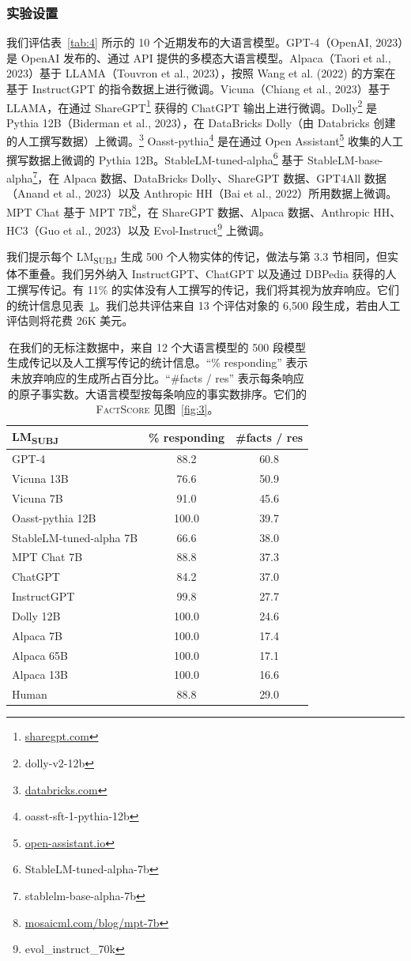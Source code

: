 \documentclass[11pt,UTF8,fontset=fandol]{ctexart}
\newcommand{\FS}{\textsc{FactScore}}
\newcommand{\subj}{LM\textsubscript{SUBJ}}
\begin{document}
\subsubsection{实验设置}

我们评估表~\ref{tab:4} 所示的 10 个近期发布的大语言模型。GPT-4（OpenAI, 2023）是 OpenAI 发布的、通过 API 提供的多模态大语言模型。Alpaca（Taori et al., 2023）基于 LLAMA（Touvron et al., 2023），按照 Wang et al. (2022) 的方案在基于 InstructGPT 的指令数据上进行微调。Vicuna（Chiang et al., 2023）基于 LLAMA，在通过 ShareGPT\footnote{\url{sharegpt.com}} 获得的 ChatGPT 输出上进行微调。Dolly\footnote{dolly-v2-12b} 是 Pythia 12B（Biderman et al., 2023），在 DataBricks Dolly（由 Databricks 创建的人工撰写数据）上微调。\footnote{\url{databricks.com}} Oasst-pythia\footnote{oasst-sft-1-pythia-12b} 是在通过 Open Assistant\footnote{\url{open-assistant.io}} 收集的人工撰写数据上微调的 Pythia 12B。StableLM-tuned-alpha\footnote{StableLM-tuned-alpha-7b} 基于 StableLM-base-alpha\footnote{stablelm-base-alpha-7b}，在 Alpaca 数据、DataBricks Dolly、ShareGPT 数据、GPT4All 数据（Anand et al., 2023）以及 Anthropic HH（Bai et al., 2022）所用数据上微调。MPT Chat 基于 MPT 7B\footnote{\url{mosaicml.com/blog/mpt-7b}}，在 ShareGPT 数据、Alpaca 数据、Anthropic HH、HC3（Guo et al., 2023）以及 Evol-Instruct\footnote{evol\_instruct\_70k} 上微调。

我们提示每个 \subj{} 生成 500 个人物实体的传记，做法与第 3.3 节相同，但实体不重叠。我们另外纳入 InstructGPT、ChatGPT 以及通过 DBPedia 获得的人工撰写传记。有 11\% 的实体没有人工撰写的传记，我们将其视为放弃响应。它们的统计信息见表~\ref{tab:5}。我们总共评估来自 13 个评估对象的 6{,}500 段生成，若由人工评估则将花费 26K 美元。

\begin{table}[H]\centering
\caption{在我们的无标注数据中，来自 12 个大语言模型的 500 段模型生成传记以及人工撰写传记的统计信息。“\% responding” 表示未放弃响应的生成所占百分比。“\#facts / res” 表示每条响应的原子事实数。大语言模型按每条响应的事实数排序。它们的 \FS{} 见图~\ref{fig:3}。}
\label{tab:5}
\begin{tabular}{lcc}
\toprule
\subj & \% responding & \#facts / res \\
\midrule
GPT-4 & 88.2 & 60.8 \\
Vicuna 13B & 76.6 & 50.9 \\
Vicuna 7B & 91.0 & 45.6 \\
Oasst-pythia 12B & 100.0 & 39.7 \\
StableLM-tuned-alpha 7B & 66.6 & 38.0 \\
MPT Chat 7B & 88.8 & 37.3 \\
ChatGPT & 84.2 & 37.0 \\
InstructGPT & 99.8 & 27.7 \\
Dolly 12B & 100.0 & 24.6 \\
Alpaca 7B & 100.0 & 17.4 \\
Alpaca 65B & 100.0 & 17.1 \\
Alpaca 13B & 100.0 & 16.6 \\
Human & 88.8 & 29.0 \\
\bottomrule
\end{tabular}
\end{table}
\end{document}

